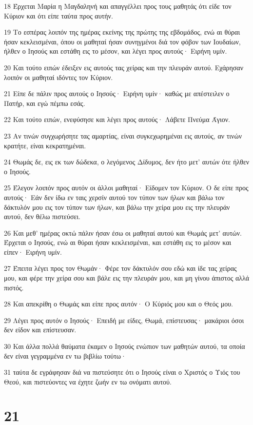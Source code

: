\par 18 Έρχεται Μαρία η Μαγδαληνή και απαγγέλλει προς τους μαθητάς ότι είδε τον Κύριον και ότι είπε ταύτα προς αυτήν.
\par 19 Το εσπέρας λοιπόν της ημέρας εκείνης της πρώτης της εβδομάδος, ενώ αι θύραι ήσαν κεκλεισμέναι, όπου οι μαθηταί ήσαν συνηγμένοι διά τον φόβον των Ιουδαίων, ήλθεν ο Ιησούς και εστάθη εις το μέσον, και λέγει προς αυτούς· Ειρήνη υμίν.
\par 20 Και τούτο ειπών έδειξεν εις αυτούς τας χείρας και την πλευράν αυτού. Εχάρησαν λοιπόν οι μαθηταί ιδόντες τον Κύριον.
\par 21 Είπε δε πάλιν προς αυτούς ο Ιησούς· Ειρήνη υμίν· καθώς με απέστειλεν ο Πατήρ, και εγώ πέμπω εσάς.
\par 22 Και τούτο ειπών, ενεφύσησε και λέγει προς αυτούς· Λάβετε Πνεύμα Άγιον.
\par 23 Αν τινών συγχωρήσητε τας αμαρτίας, είναι συγκεχωρημέναι εις αυτούς, αν τινών κρατήτε, είναι κεκρατημέναι.
\par 24 Θωμάς δε, εις εκ των δώδεκα, ο λεγόμενος Δίδυμος, δεν ήτο μετ' αυτών ότε ήλθεν ο Ιησούς.
\par 25 Έλεγον λοιπόν προς αυτόν οι άλλοι μαθηταί· Είδομεν τον Κύριον. Ο δε είπε προς αυτούς· Εάν δεν ίδω εν ταις χερσίν αυτού τον τύπον των ήλων και βάλω τον δάκτυλόν μου εις τον τύπον των ήλων, και βάλω την χείρα μου εις την πλευράν αυτού, δεν θέλω πιστεύσει.
\par 26 Και μεθ' ημέρας οκτώ πάλιν ήσαν έσω οι μαθηταί αυτού και Θωμάς μετ' αυτών. Έρχεται ο Ιησούς, ενώ αι θύραι ήσαν κεκλεισμέναι, και εστάθη εις το μέσον και είπεν· Ειρήνη υμίν.
\par 27 Έπειτα λέγει προς τον Θωμάν· Φέρε τον δάκτυλόν σου εδώ και ίδε τας χείρας μου, και φέρε την χείρα σου και βάλε εις την πλευράν μου, και μη γίνου άπιστος αλλά πιστός.
\par 28 Και απεκρίθη ο Θωμάς και είπε προς αυτόν· Ο Κύριός μου και ο Θεός μου.
\par 29 Λέγει προς αυτόν ο Ιησούς· Επειδή με είδες, Θωμά, επίστευσας· μακάριοι όσοι δεν είδον και επίστευσαν.
\par 30 Και άλλα πολλά θαύματα έκαμεν ο Ιησούς ενώπιον των μαθητών αυτού, τα οποία δεν είναι γεγραμμένα εν τω βιβλίω τούτω·
\par 31 ταύτα δε εγράφησαν διά να πιστεύσητε ότι ο Ιησούς είναι ο Χριστός ο Υιός του Θεού, και πιστεύοντες να έχητε ζωήν εν τω ονόματι αυτού.

\chapter{21}

